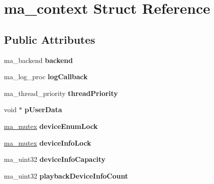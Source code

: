\hypertarget{structma__context}{}\section{ma\+\_\+context Struct Reference}
\label{structma__context}
\subsection*{Public Attributes}
\begin{DoxyCompactItemize}
\item 
\mbox{\label{structma__context_a84696d701b4be67f1b8c0a5e2aaceb31}} 
ma\+\_\+backend {\bfseries backend}
\item 
\mbox{\label{structma__context_a7ef4389811a476363c473a720e83445a}} 
ma\+\_\+log\+\_\+proc {\bfseries log\+Callback}
\item 
\mbox{\label{structma__context_a7ac85f1752ff0192281bc9cb47939e96}} 
ma\+\_\+thread\+\_\+priority {\bfseries thread\+Priority}
\item 
\mbox{\label{structma__context_ae9bae94748afbb8d5ba99fbd2a3f1d0f}} 
void $\ast$ {\bfseries p\+User\+Data}
\item 
\mbox{\label{structma__context_a81091b9765634a551f84c35ca4d3ee59}} 
\mbox{\hyperlink{structma__mutex}{ma\+\_\+mutex}} {\bfseries device\+Enum\+Lock}
\item 
\mbox{\label{structma__context_ab9218f90d18b241cd3310764658ade8a}} 
\mbox{\hyperlink{structma__mutex}{ma\+\_\+mutex}} {\bfseries device\+Info\+Lock}
\item 
\mbox{\label{structma__context_a4990c1e98a79c35bab953e5b76edc4d6}} 
ma\+\_\+uint32 {\bfseries device\+Info\+Capacity}
\item 
\mbox{\label{structma__context_a08c078117e8bd13cd6d50315bae9a02c}} 
ma\+\_\+uint32 {\bfseries playback\+Device\+Info\+Count}
\item 
\mbox{\label{structma__context_aab349ac42cdf8349e1c6f2efc8567da2}} 

\end{DoxyCompactItemize}

